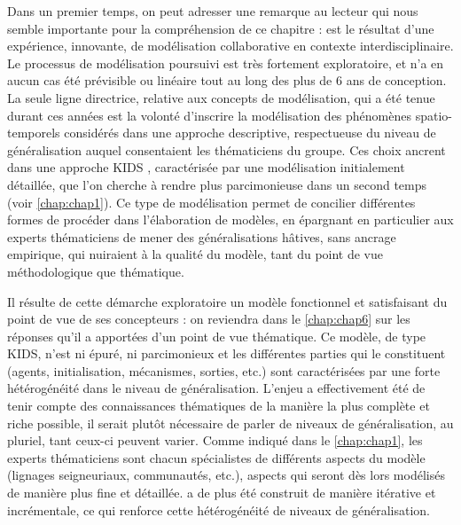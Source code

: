Dans un premier temps, on peut adresser une remarque au lecteur qui nous semble importante pour la compréhension de ce chapitre : \simfeodal{} est le résultat d'une expérience, innovante, de modélisation collaborative en contexte interdisciplinaire.
Le processus de modélisation poursuivi est très fortement exploratoire, et n'a en aucun cas été prévisible ou linéaire tout au long des plus de 6 ans de conception.
La seule ligne directrice, relative aux concepts de modélisation, qui a été tenue durant ces années est la volonté d'inscrire la modélisation des phénomènes spatio-temporels considérés dans une approche descriptive, respectueuse du niveau de généralisation auquel consentaient les thématiciens du groupe.
Ces choix ancrent \simfeodal{} dans une approche \og KIDS\fg{} \autocite{edmonds_kiss_2005}, caractérisée par une modélisation initialement détaillée, que l'on cherche à rendre plus parcimonieuse dans un second temps (voir \cref{chap:chap1}).
Ce type de modélisation permet de concilier différentes formes de procéder dans l'élaboration de modèles, en épargnant en particulier aux experts thématiciens de mener des généralisations hâtives, sans ancrage empirique, qui nuiraient à la qualité du modèle, tant du point de vue méthodologique que thématique.

Il résulte de cette démarche exploratoire un modèle fonctionnel et satisfaisant du point de vue de ses concepteurs : on reviendra dans le \cref{chap:chap6} sur les réponses qu'il a apportées d'un point de vue thématique.
Ce modèle, de type \og KIDS\fg{}, n'est ni épuré, ni parcimonieux et les différentes parties qui le constituent (agents, initialisation, mécanismes, sorties, etc.) sont caractérisées par une forte hétérogénéité dans le niveau de généralisation.
L'enjeu a effectivement été de tenir compte des connaissances thématiques de la manière la plus complète et riche possible, il serait plutôt nécessaire de parler de niveaux de généralisation, au pluriel, tant ceux-ci peuvent varier.
Comme indiqué dans le \cref{chap:chap1}, les experts thématiciens sont chacun spécialistes de différents aspects du modèle (lignages seigneuriaux, communautés, etc.), aspects qui seront dès lors modélisés de manière plus fine et détaillée.
\simfeodal{} a de plus été construit de manière itérative et incrémentale, ce qui renforce cette hétérogénéité de niveaux de généralisation.

